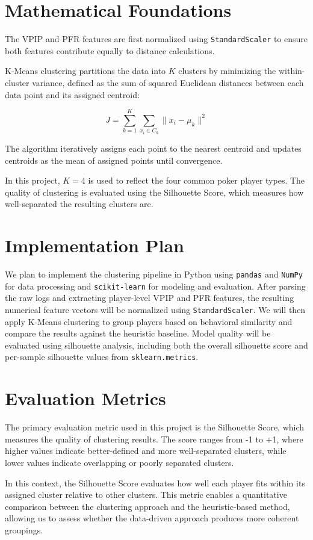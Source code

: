 \documentclass[11pt]{extarticle}
\begin{document}
\section{Mathematical Foundations}
The VPIP and PFR features are first normalized using \texttt{StandardScaler} to ensure both features contribute equally to distance calculations.

K-Means clustering partitions the data into \( K \) clusters by minimizing the within-cluster variance, defined as the sum of squared Euclidean distances between each data point and its assigned centroid:

\[
J = \sum_{k=1}^{K} \sum_{x_i \in C_k} \| x_i - \mu_k \|^2
\]

The algorithm iteratively assigns each point to the nearest centroid and updates centroids as the mean of assigned points until convergence.

In this project, \( K = 4 \) is used to reflect the four common poker player types. The quality of clustering is evaluated using the Silhouette Score, which measures how well-separated the resulting clusters are.

\section{Implementation Plan}
We plan to implement the clustering pipeline in Python using \texttt{pandas} and \texttt{NumPy} for data processing and \texttt{scikit-learn} for modeling and evaluation. After parsing the raw logs and extracting player-level VPIP and PFR features, the resulting numerical feature vectors will be normalized using \texttt{StandardScaler}. We will then apply K-Means clustering to group players based on behavioral similarity and compare the results against the heuristic baseline. Model quality will be evaluated using silhouette analysis, including both the overall silhouette score and per-sample silhouette values from \texttt{sklearn.metrics}.

\section{Evaluation Metrics}
The primary evaluation metric used in this project is the Silhouette Score, which measures the quality of clustering results. The score ranges from -1 to +1, where higher values indicate better-defined and more well-separated clusters, while lower values indicate overlapping or poorly separated clusters.

In this context, the Silhouette Score evaluates how well each player fits within its assigned cluster relative to other clusters. This metric enables a quantitative comparison between the clustering approach and the heuristic-based method, allowing us to assess whether the data-driven approach produces more coherent groupings.
\end{document}
